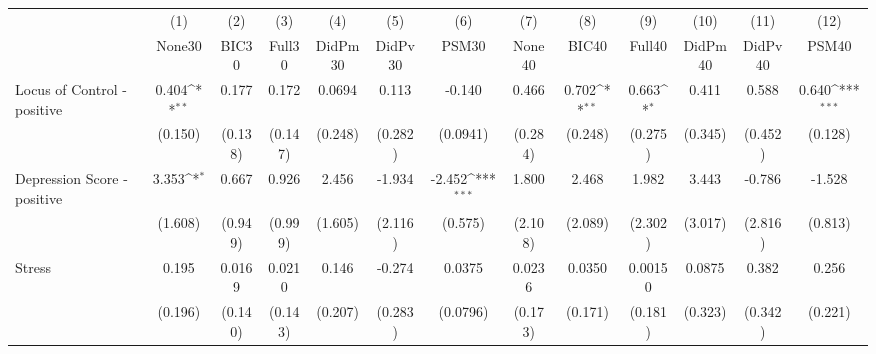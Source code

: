 {
\def\sym#1{\ifmmode^{#1}\else\(^{#1}\)\fi}
\begin{tabular}{l*{12}{c}}
\toprule
            &\multicolumn{1}{c}{(1)}&\multicolumn{1}{c}{(2)}&\multicolumn{1}{c}{(3)}&\multicolumn{1}{c}{(4)}&\multicolumn{1}{c}{(5)}&\multicolumn{1}{c}{(6)}&\multicolumn{1}{c}{(7)}&\multicolumn{1}{c}{(8)}&\multicolumn{1}{c}{(9)}&\multicolumn{1}{c}{(10)}&\multicolumn{1}{c}{(11)}&\multicolumn{1}{c}{(12)}\\
            &\multicolumn{1}{c}{None30}&\multicolumn{1}{c}{BIC30}&\multicolumn{1}{c}{Full30}&\multicolumn{1}{c}{DidPm30}&\multicolumn{1}{c}{DidPv30}&\multicolumn{1}{c}{PSM30}&\multicolumn{1}{c}{None40}&\multicolumn{1}{c}{BIC40}&\multicolumn{1}{c}{Full40}&\multicolumn{1}{c}{DidPm40}&\multicolumn{1}{c}{DidPv40}&\multicolumn{1}{c}{PSM40}\\
\midrule
Locus of Control - positive&       0.404\sym{**} &       0.177         &       0.172         &      0.0694         &       0.113         &      -0.140         &       0.466         &       0.702\sym{**} &       0.663\sym{*}  &       0.411         &       0.588         &       0.640\sym{***}\\
            &     (0.150)         &     (0.138)         &     (0.147)         &     (0.248)         &     (0.282)         &    (0.0941)         &     (0.284)         &     (0.248)         &     (0.275)         &     (0.345)         &     (0.452)         &     (0.128)         \\
\addlinespace
Depression Score - positive&       3.353\sym{*}  &       0.667         &       0.926         &       2.456         &      -1.934         &      -2.452\sym{***}&       1.800         &       2.468         &       1.982         &       3.443         &      -0.786         &      -1.528         \\
            &     (1.608)         &     (0.949)         &     (0.999)         &     (1.605)         &     (2.116)         &     (0.575)         &     (2.108)         &     (2.089)         &     (2.302)         &     (3.017)         &     (2.816)         &     (0.813)         \\
\addlinespace
Stress      &       0.195         &      0.0169         &      0.0210         &       0.146         &      -0.274         &      0.0375         &      0.0236         &      0.0350         &     0.00150         &      0.0875         &       0.382         &       0.256         \\
            &     (0.196)         &     (0.140)         &     (0.143)         &     (0.207)         &     (0.283)         &    (0.0796)         &     (0.173)         &     (0.171)         &     (0.181)         &     (0.323)         &     (0.342)         &     (0.221)         \\

\end{tabular}}

